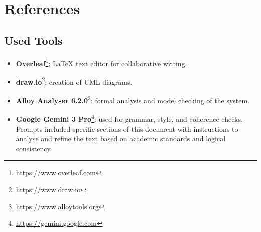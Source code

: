 \chapter{References}
\section{Used Tools}
\begin{itemize}
    \item \textbf{Overleaf}\footnote{\url{https://www.overleaf.com}}: \LaTeX \xspace text editor for collaborative writing.
    \item \textbf{draw.io}\footnote{\url{https://www.draw.io}}: creation of UML diagrams.
    \item \textbf{Alloy Analyser 6.2.0}\footnote{\url{https://www.alloytools.org}}: formal analysis and model checking of the system.
    \item \textbf{Google Gemini 3 Pro}\footnote{\url{https://gemini.google.com}}: used for grammar, style, and coherence checks. Prompts included specific sections of this document with instructions to analyse and refine the text based on academic standards and logical consistency.
\end{itemize}